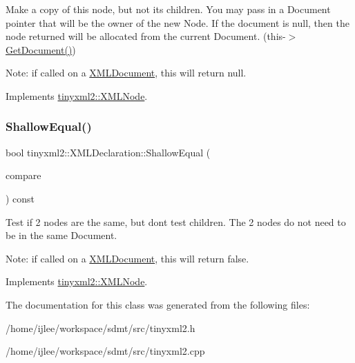 Make a copy of this node, but not its children. You may pass in a Document pointer that will be the owner of the new Node. If the \textquotesingle{}document\textquotesingle{} is null, then the node returned will be allocated from the current Document. (this-\/$>$\hyperlink{classtinyxml2_1_1_x_m_l_node_af343d1ef0b45c0020e62d784d7e67a68}{Get\+Document()})

Note\+: if called on a \hyperlink{classtinyxml2_1_1_x_m_l_document}{X\+M\+L\+Document}, this will return null. 

Implements \hyperlink{classtinyxml2_1_1_x_m_l_node_a8402cbd3129d20e9e6024bbcc0531283}{tinyxml2\+::\+X\+M\+L\+Node}.

\mbox{\label{classtinyxml2_1_1_x_m_l_declaration_ae8b4d3a399857029f36c322b0801b69c}} 
\subsubsection{\texorpdfstring{Shallow\+Equal()}{ShallowEqual()}}
{\footnotesize\ttfamily bool tinyxml2\+::\+X\+M\+L\+Declaration\+::\+Shallow\+Equal (\begin{DoxyParamCaption}\item[{const \hyperlink{classtinyxml2_1_1_x_m_l_node}{X\+M\+L\+Node} $\ast$}]{compare }\end{DoxyParamCaption}) const\hspace{0.3cm}{\ttfamily [virtual]}}

Test if 2 nodes are the same, but don\textquotesingle{}t test children. The 2 nodes do not need to be in the same Document.

Note\+: if called on a \hyperlink{classtinyxml2_1_1_x_m_l_document}{X\+M\+L\+Document}, this will return false. 

Implements \hyperlink{classtinyxml2_1_1_x_m_l_node_a7ce18b751c3ea09eac292dca264f9226}{tinyxml2\+::\+X\+M\+L\+Node}.



The documentation for this class was generated from the following files\+:\begin{DoxyCompactItemize}
\item 
/home/ijlee/workspace/sdmt/src/tinyxml2.\+h\item 
/home/ijlee/workspace/sdmt/src/tinyxml2.\+cpp\end{DoxyCompactItemize}
